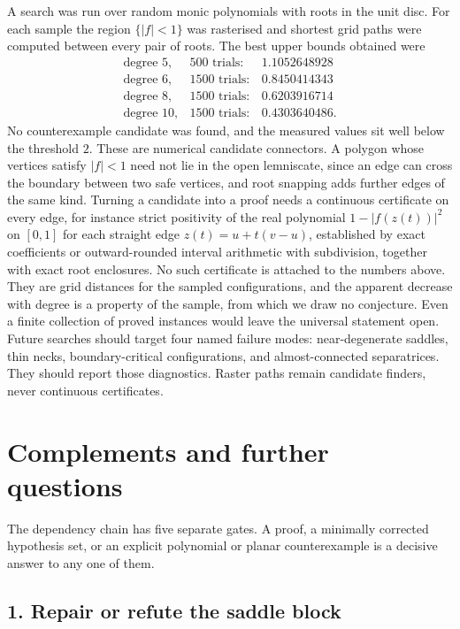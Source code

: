 A search was run over random monic polynomials with roots in the unit disc.  For
each sample the region $\{|f|<1\}$ was rasterised and shortest grid paths were
computed between every pair of roots.  The best upper bounds obtained were
\[
  \begin{array}{lrr}
    \text{degree } 5, & 500 \text{ trials}: & 1.1052648928\\
    \text{degree } 6, & 1500 \text{ trials}: & 0.8450414343\\
    \text{degree } 8, & 1500 \text{ trials}: & 0.6203916714\\
    \text{degree } 10, & 1500 \text{ trials}: & 0.4303640486 .
  \end{array}
\]
No counterexample candidate was found, and the measured values sit well below
the threshold $2$.  These are numerical candidate connectors.  A polygon whose
vertices satisfy $|f|<1$ need not lie in the open lemniscate, since an edge can
cross the boundary between two safe vertices, and root snapping adds further
edges of the same kind.  Turning a candidate into a proof needs a continuous
certificate on every edge, for instance strict positivity of the real
polynomial $1-|f(z(t))|^2$ on $[0,1]$ for each straight edge $z(t)=u+t(v-u)$,
established by exact coefficients or outward-rounded interval arithmetic with
subdivision, together with exact root enclosures.  No such certificate is
attached to the numbers above.  They are grid distances for the sampled
configurations, and the apparent decrease with degree is a property of the
sample, from which we draw no conjecture.  Even a finite collection of proved
instances would leave the universal statement open.
Future searches should target four named failure modes: near-degenerate
saddles, thin necks, boundary-critical configurations, and almost-connected
separatrices.  They should report those diagnostics.  Raster paths remain candidate
finders, never continuous certificates.

\section{Complements and further questions}\label{sec:open}

The dependency chain has five separate gates.  A proof, a minimally corrected
hypothesis set, or an explicit polynomial or planar counterexample is a
decisive answer to any one of them.

\subsection*{1. Repair or refute the saddle block}


